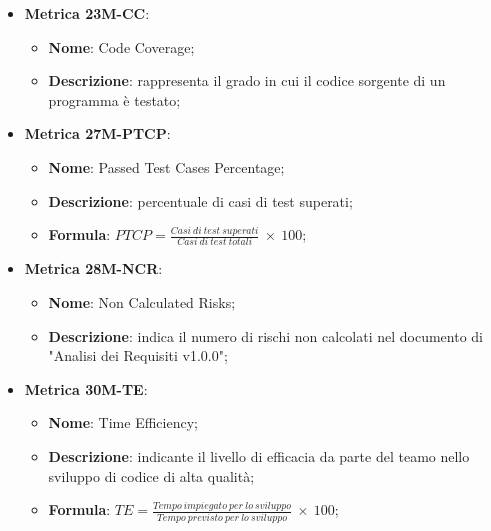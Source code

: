 \begin{itemize}
    \item \textbf{Metrica 23M-CC}:
    \begin{itemize}
        \item \textbf{Nome}: Code Coverage;
        \item \textbf{Descrizione}: rappresenta il grado in cui il codice sorgente di un programma è testato;
    \end{itemize}
\end{itemize}

\begin{itemize}
    \item \textbf{Metrica 27M-PTCP}:
    \begin{itemize}
        \item \textbf{Nome}: Passed Test Cases Percentage;
        \item \textbf{Descrizione}: percentuale di casi di test superati;
        \item \textbf{Formula}: $PTCP = \frac{Casi\: di\: test\: superati}{Casi\: di\: test\: totali}\: \times \: 100$;
    \end{itemize}
\end{itemize}

\begin{itemize}
    \item \textbf{Metrica 28M-NCR}:
    \begin{itemize}
        \item \textbf{Nome}: Non Calculated Risks;
        \item \textbf{Descrizione}: indica il numero di rischi non calcolati nel documento di "Analisi dei Requisiti v1.0.0";
    \end{itemize}
\end{itemize}

\begin{itemize}
    \item \textbf{Metrica 30M-TE}:
    \begin{itemize}
        \item \textbf{Nome}: Time Efficiency;
        \item \textbf{Descrizione}: indicante il livello di efficacia da parte del teamo nello sviluppo di codice di alta qualità;
        \item \textbf{Formula}: $TE = \frac{Tempo\: impiegato\: per\: lo\: sviluppo}{Tempo\: previsto\: per\: lo\: sviluppo}\: \times \: 100$;
    \end{itemize}
\end{itemize}

